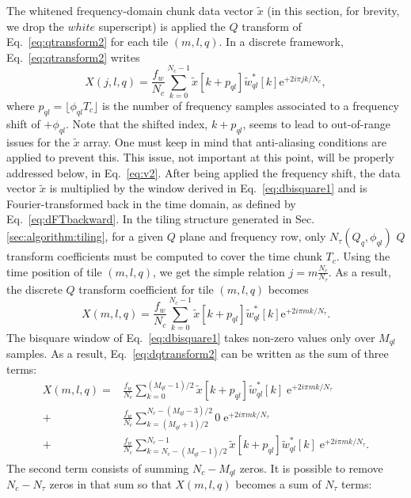 The whitened frequency-domain chunk data vector $\tilde{x}$ (in this section, for brevity, we drop the $white$ superscript) is applied the $Q$ transform of Eq.~\ref{eq:qtransform2} for each tile $(m, l, q)$. In a discrete framework, Eq.~\ref{eq:qtransform2} writes
\begin{equation}
  X(j,l,q)=\frac{f_w}{N_c}\sum_{k=0}^{N_c-1}{\tilde{x}[k+p_{ql}]\tilde{w}_{ql}^*[k]\mathrm{e}^{+2i\pi jk/N_c}},
  \label{eq:dqtransform1}
\end{equation}
where $p_{ql}=\lfloor \phi_{ql}T_c \rfloor$ is the number of frequency samples associated to a frequency shift of $+\phi_{ql}$. Note that the shifted index, $k+p_{ql}$, seems to lead to out-of-range issues for the $\tilde{x}$ array. One must keep in mind that anti-aliasing conditions are applied to prevent this. This issue, not important at this point, will be properly addressed below, in Eq.~\ref{eq:v2}. After being applied the frequency shift, the data vector $\tilde{x}$ is multiplied by the window derived in Eq.~\ref{eq:dbisquare1} and is Fourier-transformed back in the time domain, as defined by Eq.~\ref{eq:dFTbackward}. In the tiling structure generated in Sec.\ref{sec:algorithm:tiling}, for a given $Q$ plane and frequency row, only $N_\tau(Q_q, \phi_{ql})$ $Q$ transform coefficients must be computed to cover the time chunk $T_c$. Using the time position of tile $(m,l,q)$, we get the simple relation $j=m\frac{N_c}{N_\tau}$. As a result, the discrete $Q$ transform coefficient for tile $(m,l,q)$ becomes
\begin{equation}
  X(m, l, q) = \frac{f_w}{N_c}\sum_{k=0}^{N_c-1}{\tilde{x}[k+p_{ql}]\tilde{w}_{ql}^*[k]\mathrm{e}^{+2i\pi mk/N_\tau}}.
  \label{eq:dqtransform2}
\end{equation}
The bisquare window of Eq.~\ref{eq:dbisquare1} takes non-zero values only over $M_{ql}$ samples. As a result, Eq.~\ref{eq:dqtransform2} can be written as the sum of three terms:
\begin{align}
  X(m, l, q)
  = & \frac{f_w}{N_c} \sum_{k=0}^{(M_{ql}-1)/2}{\tilde{x}[k+p_{ql}]\tilde{w}_{ql}^*[k] \; \mathrm{e}^{+2i\pi mk/N_\tau}} \\
  + & \frac{f_w}{N_c} \sum_{k=(M_{ql}+1)/2}^{N_c-(M_{ql}-3)/2}{0 \; \mathrm{e}^{+2i\pi mk/N_\tau}} \\
  + & \frac{f_w}{N_c} \sum_{k=N_c-(M_{ql}-1)/2}^{N_c-1}{\tilde{x}[k+p_{ql}]\tilde{w}_{ql}^*[k] \; \mathrm{e}^{+2i\pi mk/N_\tau}} .
  \label{eq:dqtransform3}
\end{align}
The second term consists of summing $N_c-M_{ql}$ zeros. It is possible to remove $N_c-N_\tau$ zeros in that sum so that $X(m,l,q)$ becomes a sum of $N_\tau$ terms:
